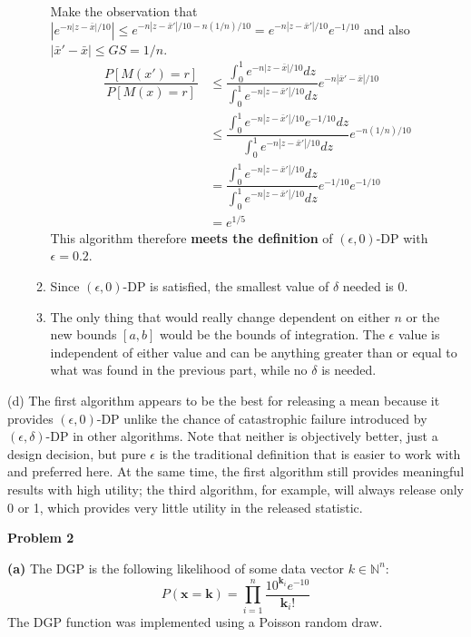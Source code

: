 \documentclass[12pt]{article}
\begin{document}
\begin{enumerate}
\begin{enumerate}

	Make the observation that $|e^{-n|z-\bar{x}|/10}| \leq e^{-n|z-\bar{x}'|/10-n(1/n)/10} =e^{-n|z-\bar{x}'|/10}e^{-1/10}$ and also $|\bar{x}'-\bar{x}| \leq GS = 1/n$.
	\begin{align*}
		\dfrac{P[M(x') = r]}{P[M(x)=r]} &\leq \dfrac{\int_0^1 e^{-n|z-\bar{x}|/10} dz}{\int_0^1 e^{-n|z-\bar{x}'|/10} dz}e^{-n|\bar{x}'-\bar{x}|/10}\\
		&\leq \dfrac{\int_0^1 e^{-n|z-\bar{x}'|/10}e^{-1/10} dz}{\int_0^1 e^{-n|z-\bar{x}'|/10} dz}e^{-n(1/n)/10}\\
		&= \dfrac{\int_0^1 e^{-n|z-\bar{x}'|/10}dz}{\int_0^1 e^{-n|z-\bar{x}'|/10} dz}e^{-1/10} e^{-1/10}\\
		&=e^{1/5}
	\end{align*}
	This algorithm therefore \textbf{meets the definition} of $(\epsilon, 0)$-DP with $\boxed{\epsilon=0.2}$.
	\item Since $(\epsilon, 0)$-DP is satisfied, the smallest value of $\delta$ needed is 0.
	\item The only thing that would really change dependent on either $n$ or the new bounds $[a, b]$ would be the bounds of integration. The $\epsilon$ value is independent of either value and can be anything greater than or equal to what was found in the previous part, while no $\delta$ is needed.
	\end{enumerate}
\end{enumerate}
(d) The first algorithm appears to be the best for releasing a mean because it provides $(\epsilon, 0)$-DP unlike the chance of catastrophic failure introduced by $(\epsilon, \delta)$-DP in other algorithms. Note that neither is objectively better, just a design decision, but pure $\epsilon$ is the traditional definition that is easier to work with and preferred here. At the same time, the first algorithm still provides meaningful results with high utility; the third algorithm, for example, will always release only 0 or 1, which provides very little utility in the released statistic.

\pagebreak

{\large\textbf{Problem 2}}

\textbf{(a)} The DGP is the following likelihood of some data vector $k\in\mathbb{N}^n$:
\[P(\mathbf{x} = \mathbf{k}) = \prod\limits^n_{i=1} \dfrac{10^{\mathbf{k}_i}e^{-10}}{\mathbf{k}_i!}\]
The DGP function was implemented using a Poisson random draw.
\end{document}
